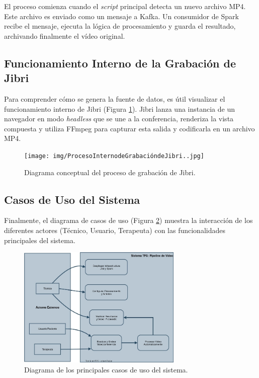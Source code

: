 El proceso comienza cuando el \textit{script} principal detecta un nuevo archivo MP4. Este archivo es enviado como un mensaje a Kafka. Un consumidor de Spark recibe el mensaje, ejecuta la lógica de procesamiento y guarda el resultado, archivando finalmente el vídeo original.

\subsection{Funcionamiento Interno de la Grabación de Jibri}
Para comprender cómo se genera la fuente de datos, es útil visualizar el funcionamiento interno de Jibri (Figura \ref{fig:flujo_jibri}). Jibri lanza una instancia de un navegador en modo \textit{headless} que se une a la conferencia, renderiza la vista compuesta y utiliza FFmpeg para capturar esta salida y codificarla en un archivo MP4.

\begin{figure}[H]
    \centering
    \texttt{[image: img/ProcesoInternodeGrabacióndeJibri..jpg]}
    \caption{Diagrama conceptual del proceso de grabación de Jibri.}
    \label{fig:flujo_jibri}
\end{figure}

\subsection{Casos de Uso del Sistema}
Finalmente, el diagrama de casos de uso (Figura \ref{fig:casos_uso}) muestra la interacción de los diferentes actores (Técnico, Usuario, Terapeuta) con las funcionalidades principales del sistema.

\begin{figure}[H]
    \centering
    \includegraphics[width=0.7\textwidth]{img/Diagramacasodeuso.jpg}
    \caption{Diagrama de los principales casos de uso del sistema.}
    \label{fig:casos_uso}
\end{figure}

